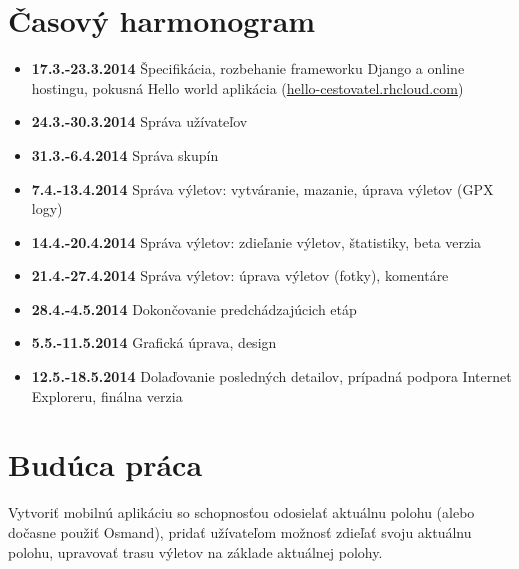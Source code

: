 \documentclass[12pt,a4paper]{scrartcl}
\begin{document}
\section{Časový harmonogram}
\begin{itemize}
	\item{\bf 17.3.-23.3.2014} Špecifikácia, rozbehanie frameworku Django a online hostingu, pokusná Hello world aplikácia (\href{http://hello-cestovatel.rhcloud.com}{hello-cestovatel.rhcloud.com})
	\item{\bf 24.3.-30.3.2014} Správa užívateľov
	\item{\bf 31.3.-6.4.2014} Správa skupín
	\item{\bf 7.4.-13.4.2014} Správa výletov: vytváranie, mazanie, úprava výletov (GPX logy)
	\item{\bf 14.4.-20.4.2014} Správa výletov: zdieľanie výletov, štatistiky, beta verzia
	\item{\bf 21.4.-27.4.2014} Správa výletov: úprava výletov (fotky), komentáre
	\item{\bf 28.4.-4.5.2014} Dokončovanie predchádzajúcich etáp
	\item{\bf 5.5.-11.5.2014} Grafická úprava, design
	\item{\bf 12.5.-18.5.2014} Dolaďovanie posledných detailov, prípadná podpora Internet Exploreru, finálna verzia
\end{itemize}

\section{Budúca práca}

Vytvoriť mobilnú aplikáciu so schopnosťou odosielať aktuálnu polohu (alebo dočasne použiť Osmand), pridať užívateľom možnosť zdieľať svoju aktuálnu polohu, upravovať trasu výletov na základe aktuálnej polohy.
\end{document}
